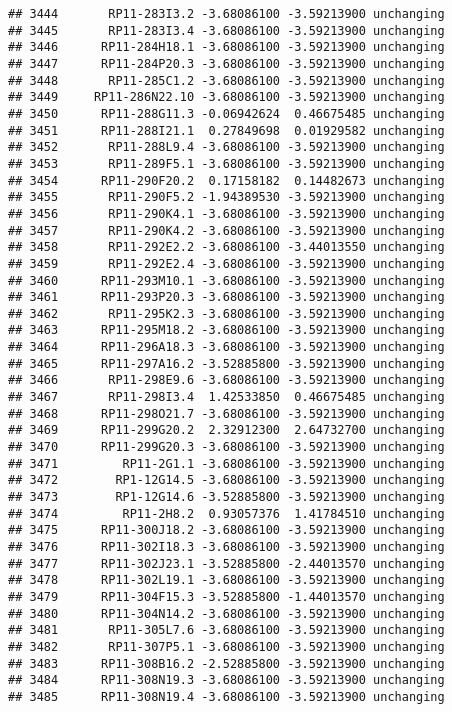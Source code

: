 \documentclass[]{article}
\begin{document}
\begin{verbatim}
## 3444       RP11-283I3.2 -3.68086100 -3.59213900 unchanging
## 3445       RP11-283I3.4 -3.68086100 -3.59213900 unchanging
## 3446      RP11-284H18.1 -3.68086100 -3.59213900 unchanging
## 3447      RP11-284P20.3 -3.68086100 -3.59213900 unchanging
## 3448       RP11-285C1.2 -3.68086100 -3.59213900 unchanging
## 3449     RP11-286N22.10 -3.68086100 -3.59213900 unchanging
## 3450      RP11-288G11.3 -0.06942624  0.46675485 unchanging
## 3451      RP11-288I21.1  0.27849698  0.01929582 unchanging
## 3452       RP11-288L9.4 -3.68086100 -3.59213900 unchanging
## 3453       RP11-289F5.1 -3.68086100 -3.59213900 unchanging
## 3454      RP11-290F20.2  0.17158182  0.14482673 unchanging
## 3455       RP11-290F5.2 -1.94389530 -3.59213900 unchanging
## 3456       RP11-290K4.1 -3.68086100 -3.59213900 unchanging
## 3457       RP11-290K4.2 -3.68086100 -3.59213900 unchanging
## 3458       RP11-292E2.2 -3.68086100 -3.44013550 unchanging
## 3459       RP11-292E2.4 -3.68086100 -3.59213900 unchanging
## 3460      RP11-293M10.1 -3.68086100 -3.59213900 unchanging
## 3461      RP11-293P20.3 -3.68086100 -3.59213900 unchanging
## 3462       RP11-295K2.3 -3.68086100 -3.59213900 unchanging
## 3463      RP11-295M18.2 -3.68086100 -3.59213900 unchanging
## 3464      RP11-296A18.3 -3.68086100 -3.59213900 unchanging
## 3465      RP11-297A16.2 -3.52885800 -3.59213900 unchanging
## 3466       RP11-298E9.6 -3.68086100 -3.59213900 unchanging
## 3467       RP11-298I3.4  1.42533850  0.46675485 unchanging
## 3468      RP11-298O21.7 -3.68086100 -3.59213900 unchanging
## 3469      RP11-299G20.2  2.32912300  2.64732700 unchanging
## 3470      RP11-299G20.3 -3.68086100 -3.59213900 unchanging
## 3471         RP11-2G1.1 -3.68086100 -3.59213900 unchanging
## 3472        RP1-12G14.5 -3.68086100 -3.59213900 unchanging
## 3473        RP1-12G14.6 -3.52885800 -3.59213900 unchanging
## 3474         RP11-2H8.2  0.93057376  1.41784510 unchanging
## 3475      RP11-300J18.2 -3.68086100 -3.59213900 unchanging
## 3476      RP11-302I18.3 -3.68086100 -3.59213900 unchanging
## 3477      RP11-302J23.1 -3.52885800 -2.44013570 unchanging
## 3478      RP11-302L19.1 -3.68086100 -3.59213900 unchanging
## 3479      RP11-304F15.3 -3.52885800 -1.44013570 unchanging
## 3480      RP11-304N14.2 -3.68086100 -3.59213900 unchanging
## 3481       RP11-305L7.6 -3.68086100 -3.59213900 unchanging
## 3482       RP11-307P5.1 -3.68086100 -3.59213900 unchanging
## 3483      RP11-308B16.2 -2.52885800 -3.59213900 unchanging
## 3484      RP11-308N19.3 -3.68086100 -3.59213900 unchanging
## 3485      RP11-308N19.4 -3.68086100 -3.59213900 unchanging

\end{verbatim}
\end{document}
